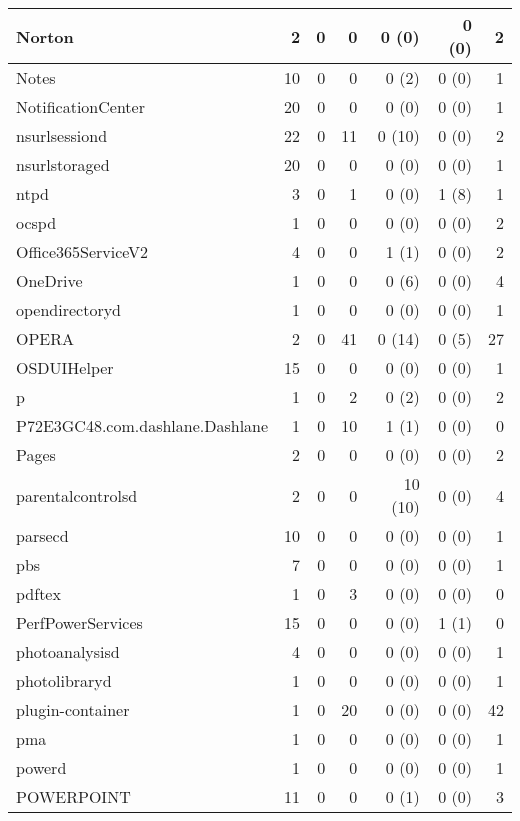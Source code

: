 \begin{adjustwidth}{-2in}{}
\begin{scriptsize}
\begin{longtable}[l]{ l | r | r | r | r | r | r }
    Norton & 2 &  0 &  0 &  0 (0) &  0 (0) &  2 \\ \hline
    Notes & 10 &  0 &  0 &  0 (2) &  0 (0) &  1 \\ \hline
    NotificationCenter &  20 &  0 &  0 &  0 (0) &  0 (0) &  1 \\ \hline
    nsurlsessiond & 22 &  0 & 11 & 0 (10) &  0 (0) &  2 \\ \hline
    nsurlstoraged & 20 &  0 &  0 &  0 (0) &  0 (0) &  1 \\ \hline
    ntpd & 3 &  0 &  1 &  0 (0) &  1 (8) &  1 \\ \hline
    ocspd &  1 &  0 &  0 &  0 (0) &  0 (0) &  2 \\ \hline
    Office365ServiceV2 & 4 &  0 &  0 &  1 (1) &  0 (0) &  2 \\ \hline
    OneDrive & 1 &  0 &  0 &  0 (6) &  0 (0) &  4 \\ \hline
    opendirectoryd & 1 &  0 &  0 &  0 (0) &  0 (0) &  1 \\ \hline
    OPERA &  2 &  0 & 41 & 0 (14) &  0 (5) & 27 \\ \hline
    OSDUIHelper & 15 &  0 &  0 &  0 (0) &  0 (0) &  1 \\ \hline
    p &  1 &  0 &  2 &  0 (2) &  0 (0) &  2 \\ \hline
    P72E3GC48.com.dashlane.Dashlane &  1 &  0 & 10 &  1 (1) &  0 (0) &  0 \\ \hline
    Pages &  2 &  0 &  0 &  0 (0) &  0 (0) &  2 \\ \hline
    parentalcontrolsd &  2 &  0 &  0 &  10 (10) &  0 (0) &  4 \\ \hline
    parsecd & 10 &  0 &  0 &  0 (0) &  0 (0) &  1 \\ \hline
    pbs &  7 &  0 &  0 &  0 (0) &  0 (0) &  1 \\ \hline
    pdftex & 1 &  0 &  3 &  0 (0) &  0 (0) &  0 \\ \hline
    PerfPowerServices & 15 &  0 &  0 &  0 (0) &  1 (1) &  0 \\ \hline
    photoanalysisd & 4 &  0 &  0 &  0 (0) &  0 (0) &  1 \\ \hline
    photolibraryd &  1 &  0 &  0 &  0 (0) &  0 (0) &  1 \\ \hline
    plugin-container & 1 &  0 & 20 &  0 (0) &  0 (0) & 42 \\ \hline
    pma &  1 &  0 &  0 &  0 (0) &  0 (0) &  1 \\ \hline
    powerd & 1 &  0 &  0 &  0 (0) &  0 (0) &  1 \\ \hline
    POWERPOINT &  11 &  0 &  0 &  0 (1) &  0 (0) &  3 \\ \hline

\end{longtable}
\end{scriptsize}
\end{adjustwidth}
